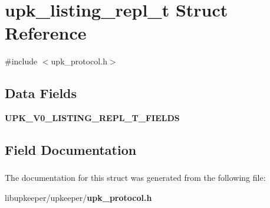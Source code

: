 \section{upk\_\-listing\_\-repl\_\-t Struct Reference}
\label{structupk__listing__repl__t}


{\ttfamily \#include $<$upk\_\-protocol.h$>$}

\subsection*{Data Fields}
\begin{DoxyCompactItemize}
\item 
{\bf UPK\_\-V0\_\-LISTING\_\-REPL\_\-T\_\-FIELDS}
\end{DoxyCompactItemize}


\subsection{Field Documentation}
\subsubsection[{UPK\_\-V0\_\-LISTING\_\-REPL\_\-T\_\-FIELDS}]{}\label{structupk__listing__repl__t_a75d6cc2908c821b4816eead9549751b9}


The documentation for this struct was generated from the following file:\begin{DoxyCompactItemize}
\item 
libupkeeper/upkeeper/{\bf upk\_\-protocol.h}\end{DoxyCompactItemize}
